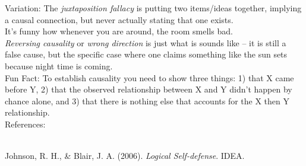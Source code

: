 \documentclass[a4paper,12pt,single,pdftex]{scrbook}
\begin{document}
{    
      Variation: The {\it juxtaposition fallacy} is putting two items/ideas together, implying a causal connection, but never actually stating that one exists.
    \\

    
      It’s funny how whenever you are around, the room smells bad.
    \\

    
      {\it Reversing causality} or {\it wrong direction }is just what is sounds like -- it is still a false cause, but the specific case where one claims something like the sun sets because night time is coming.
    \\

    
      Fun Fact: To establish causality you need to show three things: 1) that X came before Y, 2) that the observed relationship between X and Y didn't happen by chance alone, and 3) that there is nothing else that accounts for the X then Y relationship.
    \\

    References:

    
      
        
      \\

      
        
          Johnson, R. H., \& Blair, J. A. (2006). {\it Logical Self-defense}. IDEA.
        
      
    
  }
\end{document}
